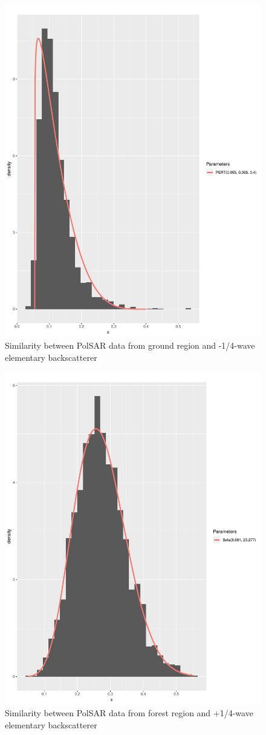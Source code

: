 \documentclass[conference]{IEEEtran}
\begin{document}
\begin{figure}[!ht]
    \centering
    \includegraphics[width = .9\linewidth, height = .7\linewidth]{../../../Figures/paper_19_05/wvn_ground.pdf}
    \caption{Similarity between PolSAR data from ground region and -1/4-wave elementary backscatterer}
    \label{fig:gr_wvn}
\end{figure}

\begin{figure}[!ht]
    \centering
    \includegraphics[width = .9\linewidth, height = .7\linewidth]{../../../Figures/paper_19_05/wvp_vegetation.pdf}
    \caption{Similarity between PolSAR data from forest region and +1/4-wave elementary backscatterer}
    \label{fig:fr_wvp}
\end{figure}
\end{document}
